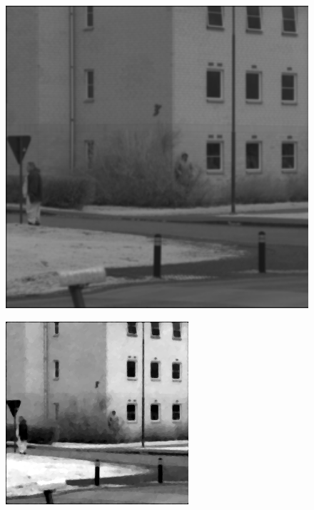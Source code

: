 \begin{figure}[H]
    \centering
\begin{minipage}[t]{0.32\textwidth}
    \includegraphics[width=1\textwidth]{result/dynamic/fly/flyby_1sec_org.png}
    \label{fig:fly_1}
\end{minipage}
\begin{minipage}[t]{0.32\textwidth}
    \includegraphics[width = \textwidth]{result/dynamic/fly/flyby_1sec_ref.png}

\end{minipage}
\end{figure}
